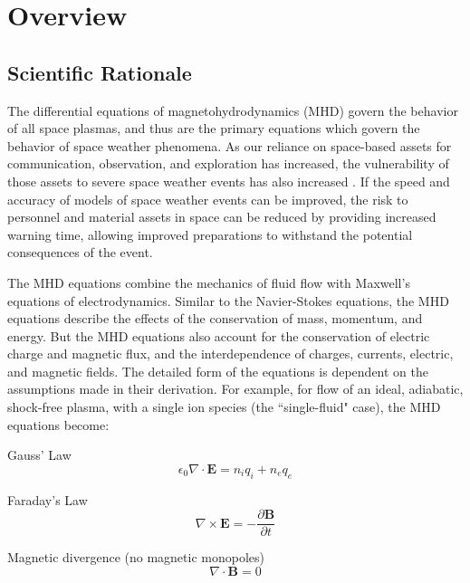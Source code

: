 \documentclass{article}
\begin{document}
\newpage

\section{Overview}

\subsection{Scientific Rationale}

The differential equations of magnetohydrodynamics (MHD) govern the behavior of all space plasmas, and thus are the primary equations which govern the behavior of space weather phenomena. As our reliance on space-based assets for communication, observation, and exploration has increased, the vulnerability of those assets to severe space weather events has also increased \cite{NRC2009}. If the speed and accuracy of models of space weather events can be improved, the risk to personnel and material assets in space can be reduced by providing increased warning time, allowing improved preparations to withstand the potential consequences of the event.

The MHD equations combine the mechanics of fluid flow with Maxwell's equations of electrodynamics. Similar to the Navier-Stokes equations, the MHD equations describe the effects of the conservation of mass, momentum, and energy. But the MHD equations also account for the conservation of electric charge and magnetic flux, and the interdependence of charges, currents, electric, and magnetic fields. The detailed form of the equations is dependent on the assumptions made in their derivation. For example, for flow of an ideal, adiabatic, shock-free plasma, with a single ion species (the ``single-fluid" case), the MHD equations \cite{Chen1984} become:

\bigskip

Gauss' Law
\begin{equation}
    \epsilon_0 \nabla \cdotp \mathbf E = n_i q_i + n_e q_e
    \label{eq:GaussLaw}
\end{equation}

Faraday's Law
\begin{equation}
    \nabla \times \mathbf E = -\frac {\partial \mathbf B} {\partial t}
    \label{eq:FaradayLaw}
\end{equation}

Magnetic divergence (no magnetic monopoles)
\begin{equation}
  \nabla \cdotp \mathbf B = 0
  \label{eq:mhd_MagneticDivergence}
\end{equation}
\end{document}
